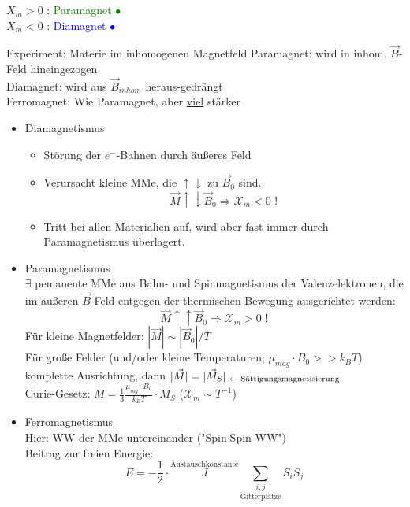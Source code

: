 \begin{center}
	$ X_m > 0 $ \hspace{5mm} : \textcolor{green}{Paramagnet $ \bullet $}\\
	$ X_m < 0 $ \hspace{5mm} : \textcolor{blue}{Diamagnet $ \bullet $}
\end{center}
\bild
Experiment: Materie im inhomogenen Magnetfeld
\bild
Paramagnet: wird in inhom. $ \vec{B} $-Feld hineingezogen\\
Diamagnet: wird aus $ \vec{B}_{inhom} $ heraus-gedrängt\\
Ferromagnet: Wie Paramagnet, aber \underline{viel} stärker\\
\begin{itemize}
	\item Diamagnetismus\\
	\begin{itemize}
		\item Störung der $ e^- $-Bahnen durch äußeres Feld
		\item Verursacht kleine MMe, die $ \uparrow \downarrow $ zu $ \vec{B}_0 $ sind.
		$$ \vec{M}  \uparrow \downarrow  \vec{B}_0 \Rightarrow \mathcal{X}_m <0 \text{ !} $$
		\item Tritt bei allen Materialien auf, wird aber fast immer durch Paramagnetismus überlagert.
	\end{itemize}
	\item Paramagnetismus\\
	$ \exists $ pemanente MMe aus Bahn- und Spinmagnetismus der Valenzelektronen, die im äußeren $ \vec{B} $-Feld entgegen der thermischen Bewegung ausgerichtet werden:
	$$ \vec{M} \uparrow\uparrow \vec{B}_0 \Rightarrow \mathcal{X}_m > 0 \text{ !}$$ 
	Für kleine Magnetfelder: $ |\vec{M}| \sim |\vec{B}_0|/T$ \\
	Für große Felder (und/oder kleine Temperaturen; $ \mu_{mag} \cdot B_0 >> k_BT $) komplette Ausrichtung, dann $ |\vec{M}| = |\vec{M}_S|_{\text{ $ \leftarrow $  Sättigungsmagnetisierung}} $\\
	\bild
	Curie-Gesetz: $ M = \frac{1}{3} \frac{\mu_{mg}\cdot B_0}{k_BT} \cdot M_S $ \hspace{1cm} ($ \mathcal{X}_m \sim T^{-1}$)
	\item Ferromagnetismus\\
	Hier: WW der MMe untereinander ("Spin$ \cdot $Spin-WW")\\
	Beitrag zur freien Energie: \\
	$$ E = -\frac{1}{2} \cdot \overset{\text{Austauschkonstante}}{J} \underset{\text{Gitterplätze}}{\sum_{i,j}} S_i S_j $$

\end{itemize}

